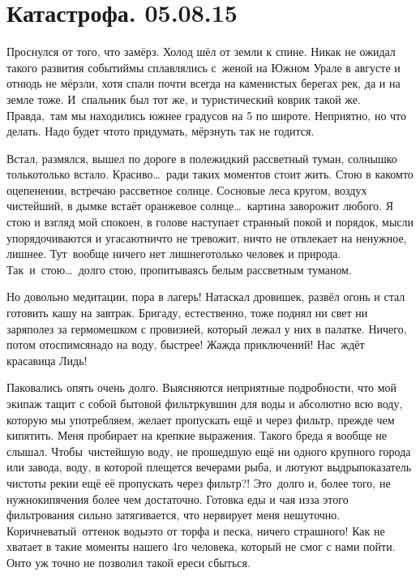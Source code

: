 \chapter{Катастрофа. 05.08.15}

Проснулся от того, что замёрз. Холод шёл от земли к спине. Никак не ожидал такого развития событий\mdash мы сплавлялись с~женой на Южном Урале в августе и отнюдь не мёрзли, хотя спали почти всегда на каменистых берегах рек, да и на земле тоже. И~спальник был тот же, и туристический коврик такой же. Правда,~там мы находились южнее градусов на 5 по широте. Неприятно, но что делать. Надо будет что\sdash то придумать, мёрзнуть так не годится. 

Встал, размялся, вышел по дороге в поле\mdash жидкий рассветный туман, солнышко только\sdash только встало. Красиво\ldots~ради таких моментов стоит жить. Стою в каком\sdash то оцепенении, встречаю рассветное солнце. Сосновые леса кругом, воздух чистейший, в дымке встаёт оранжевое солнце\ldots~картина заворожит любого. Я стою и взгляд мой спокоен, в голове наступает странный покой и порядок, мысли упорядочиваются и угасают\mdash ничто не тревожит, ничто не отвлекает на ненужное, лишнее. Тут~вообще ничего нет лишнего\mdash только человек и природа. Так~и~стою\ldots~долго стою, пропитываясь белым рассветным туманом.

Но довольно медитации, пора в лагерь! Натаскал дровишек, развёл огонь и стал готовить кашу на завтрак. Бригаду, естественно, тоже поднял ни свет ни заря\mdash полез за гермомешком с провизией, который лежал у них в палатке. Ничего, потом отоспимся\mdash надо на воду, быстрее! Жажда приключений! Нас~ждёт красавица Лидь! 

Паковались опять очень долго. Выясняются неприятные подробности, что мой экипаж тащит с собой бытовой фильтр\sdash кувшин для воды и абсолютно всю воду, которую мы употребляем, желает пропускать ещё и через фильтр, прежде чем кипятить. Меня пробирает на крепкие выражения. Такого бреда я вообще не слышал. Чтобы~чистейшую воду, не прошедшую ещё ни одного крупного города или завода, воду, в которой плещется вечерами рыба, и лютуют выдры\mdash показатель чистоты реки\mdash и ещё её пропускать через фильтр?! Это~долго и, более того, не нужно\mdash кипячения более чем достаточно. Готовка еды и чая из\sdash за этого фильтрования сильно затягивается, что нервирует меня нешуточно. Коричневатый~оттенок воды\mdash это от торфа и песка, ничего страшного! Как не хватает в такие моменты нашего 4\sdash го человека, который не смог с нами пойти. Он\sdash то уж точно не позволил такой ереси сбыться. 

